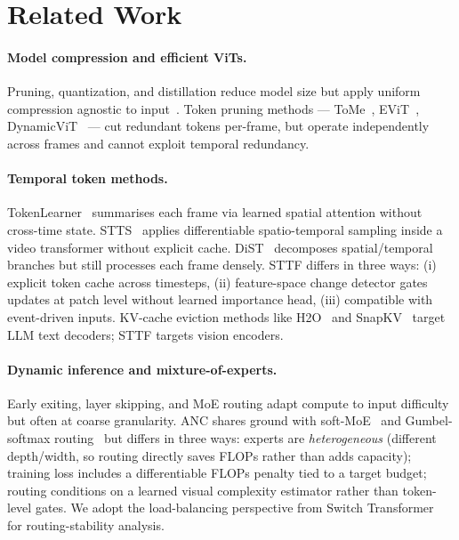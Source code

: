 \documentclass{article}
\begin{document}
\section{Related Work}

\paragraph{Model compression and efficient ViTs.}
Pruning, quantization, and distillation reduce model size but apply uniform compression agnostic to input~\cite{han2016deepcompression, hinton2015distillation}. Token pruning methods — ToMe~\cite{bolya2023tome}, EViT~\cite{liang2022evit}, DynamicViT~\cite{rao2021dynamicvit} — cut redundant tokens per-frame, but operate independently across frames and cannot exploit temporal redundancy.

\paragraph{Temporal token methods.}
TokenLearner~\cite{ryoo2021tokenlearner} summarises each frame via learned spatial attention without cross-time state. STTS~\cite{wang2022stts} applies differentiable spatio-temporal sampling inside a video transformer without explicit cache. DiST~\cite{qing2023dist} decomposes spatial/temporal branches but still processes each frame densely. STTF differs in three ways: (i) explicit token cache across timesteps, (ii) feature-space change detector gates updates at patch level without learned importance head, (iii) compatible with event-driven inputs. KV-cache eviction methods like H2O~\cite{zhang2023h2o} and SnapKV~\cite{li2024snapkv} target LLM text decoders; STTF targets vision encoders.

\paragraph{Dynamic inference and mixture-of-experts.}
Early exiting, layer skipping, and MoE routing adapt compute to input difficulty but often at coarse granularity. ANC shares ground with soft-MoE~\cite{shazeer2017moe, puigcerver2024softmoe} and Gumbel-softmax routing~\cite{jang2017gumbel} but differs in three ways: experts are \emph{heterogeneous} (different depth/width, so routing directly saves FLOPs rather than adds capacity); training loss includes a differentiable FLOPs penalty tied to a target budget; routing conditions on a learned visual complexity estimator rather than token-level gates. We adopt the load-balancing perspective from Switch Transformer~\cite{fedus2022switch} for routing-stability analysis.
\end{document}
